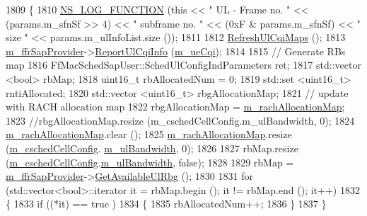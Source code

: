 \begin{DoxyCode}
1809 \{
1810   \hyperlink{log-macros-disabled_8h_a90b90d5bad1f39cb1b64923ea94c0761}{NS\_LOG\_FUNCTION} (\textcolor{keyword}{this} << \textcolor{stringliteral}{" UL - Frame no. "} << (params.m\_sfnSf >> 4) << \textcolor{stringliteral}{" subframe no. "} 
      << (0xF & params.m\_sfnSf) << \textcolor{stringliteral}{" size "} << params.m\_ulInfoList.size ());
1811 
1812   \hyperlink{classns3_1_1PssFfMacScheduler_a7f324be2e5aedb9053989a1bb82036ca}{RefreshUlCqiMaps} ();
1813   \hyperlink{classns3_1_1PssFfMacScheduler_a8b7889293dd002f806e2d6afd9c50aed}{m\_ffrSapProvider}->\hyperlink{classns3_1_1LteFfrSapProvider_a14e6bcaf7db6afcb42f75122717313b1}{ReportUlCqiInfo} (\hyperlink{classns3_1_1PssFfMacScheduler_abd1f917911a86bfd576e93ec67d7b8b2}{m\_ueCqi});
1814 
1815   \textcolor{comment}{// Generate RBs map}
1816   FfMacSchedSapUser::SchedUlConfigIndParameters ret;
1817   std::vector <bool> rbMap;
1818   uint16\_t rbAllocatedNum = 0;
1819   std::set <uint16\_t> rntiAllocated;
1820   std::vector <uint16\_t> rbgAllocationMap;
1821   \textcolor{comment}{// update with RACH allocation map}
1822   rbgAllocationMap = \hyperlink{classns3_1_1PssFfMacScheduler_af093989004d46e1bf45ba2bdb1dfa03e}{m\_rachAllocationMap};
1823   \textcolor{comment}{//rbgAllocationMap.resize (m\_cschedCellConfig.m\_ulBandwidth, 0);}
1824   \hyperlink{classns3_1_1PssFfMacScheduler_af093989004d46e1bf45ba2bdb1dfa03e}{m\_rachAllocationMap}.clear ();
1825   \hyperlink{classns3_1_1PssFfMacScheduler_af093989004d46e1bf45ba2bdb1dfa03e}{m\_rachAllocationMap}.resize (\hyperlink{classns3_1_1PssFfMacScheduler_a6808e2b2024ed0ced82f80bfe6f0801f}{m\_cschedCellConfig}.
      \hyperlink{structns3_1_1FfMacCschedSapProvider_1_1CschedCellConfigReqParameters_a5ab5b102878e6e7e7727a14af4a64d2f}{m\_ulBandwidth}, 0);
1826 
1827   rbMap.resize (\hyperlink{classns3_1_1PssFfMacScheduler_a6808e2b2024ed0ced82f80bfe6f0801f}{m\_cschedCellConfig}.\hyperlink{structns3_1_1FfMacCschedSapProvider_1_1CschedCellConfigReqParameters_a5ab5b102878e6e7e7727a14af4a64d2f}{m\_ulBandwidth}, \textcolor{keyword}{false});
1828 
1829   rbMap = \hyperlink{classns3_1_1PssFfMacScheduler_a8b7889293dd002f806e2d6afd9c50aed}{m\_ffrSapProvider}->\hyperlink{classns3_1_1LteFfrSapProvider_aafd23b22a27ec83e03d54795c122d175}{GetAvailableUlRbg} ();
1830 
1831   \textcolor{keywordflow}{for} (std::vector<bool>::iterator it = rbMap.begin (); it != rbMap.end (); it++)
1832     \{
1833       \textcolor{keywordflow}{if} ((*it) == true )
1834         \{
1835           rbAllocatedNum++;
1836         \}
1837     \}

\end{DoxyCode}

